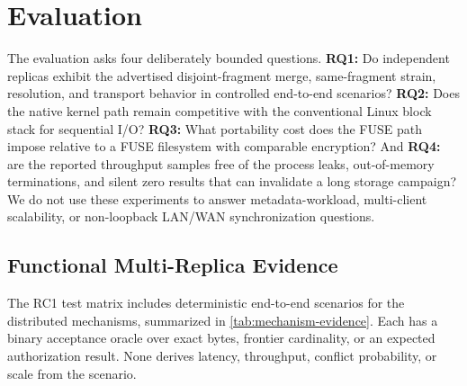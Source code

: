 \section{Evaluation}
\label{sec:eval}

The evaluation asks four deliberately bounded questions.  \textbf{RQ1:} Do
independent replicas exhibit the advertised disjoint-fragment merge,
same-fragment strain, resolution, and transport behavior in controlled
end-to-end scenarios?  \textbf{RQ2:} Does the native kernel path remain
competitive with the conventional Linux block stack for sequential I/O?
\textbf{RQ3:} What portability cost does the FUSE path impose relative to a
FUSE filesystem with comparable encryption?  And \textbf{RQ4:} are the
reported throughput samples free of the process leaks, out-of-memory
terminations, and silent zero results that can invalidate a long storage
campaign?  We do not use these experiments to answer metadata-workload,
multi-client scalability, or non-loopback LAN/WAN synchronization questions.

\subsection{Functional Multi-Replica Evidence}
\label{subsec:eval-mechanisms}

The RC1 test matrix includes deterministic end-to-end scenarios for the
distributed mechanisms, summarized in \cref{tab:mechanism-evidence}.  Each has
a binary acceptance oracle over exact bytes, frontier cardinality, or an
expected authorization result.  None derives latency, throughput, conflict
probability, or scale from the scenario.

